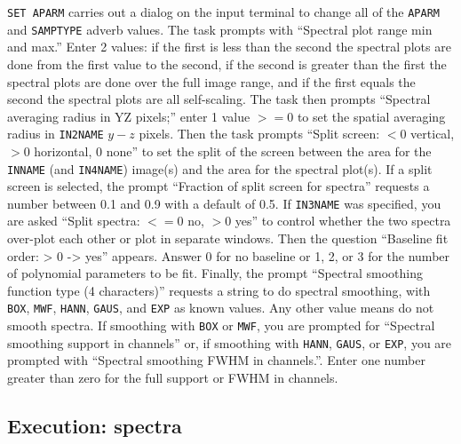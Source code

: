 \documentclass[twoside]{article}
\begin{document}
{\tt SET APARM} carries out a dialog on the input terminal to change
all of the {\tt APARM} and {\tt SAMPTYPE} adverb values.  The task
prompts with ``Spectral plot range min and max.''  Enter 2 values: if
the first is less than the second the spectral plots are done from the
first value to the second, if the second is greater than the first the
spectral plots are done over the full image range, and if the first
equals the second the spectral plots are all self-scaling.  The
task then prompts ``Spectral averaging radius in YZ pixels;'' enter 1
value $>= 0$ to set the spatial averaging radius in {\tt IN2NAME}
$y-z$ pixels.  Then the task prompts ``Split screen: $< 0$ vertical,
$> 0$ horizontal, 0 none'' to set the split of the screen between the
area for the {\tt INNAME} (and {\tt IN4NAME}) image(s) and the area
for the spectral plot(s).  If a split screen is selected, the prompt
``Fraction of split screen for spectra'' requests a number between 0.1
and 0.9 with a default of 0.5.  If {\tt IN3NAME} was specified, you
are asked ``Split spectra: $<= 0$ no, $> 0$ yes'' to control whether
the two spectra over-plot each other or plot in separate windows.
Then the question ``Baseline fit order: > 0 -> yes'' appears.  Answer
0 for no baseline or 1, 2, or 3 for the number of polynomial parameters
to be fit.  Finally, the prompt ``Spectral smoothing function type (4
characters)'' requests a string to do spectral smoothing, with {\tt
  BOX}, {\tt MWF}, {\tt HANN}, {\tt GAUS}, and {\tt EXP} as known
values.  Any other value means do not smooth spectra.  If smoothing
with {\tt BOX} or {\tt MWF}, you are prompted for ``Spectral smoothing
support in channels'' or, if smoothing with {\tt HANN}, {\tt GAUS}, or
{\tt EXP}, you are prompted with ``Spectral smoothing FWHM in
channels.''.  Enter one number greater than zero for the full support
or FWHM in channels.

\subsection{Execution: spectra}
\end{document}
